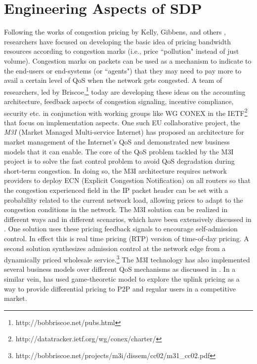 \section{Engineering Aspects of SDP}\label{sec:engg}

Following the works of congestion pricing by Kelly, Gibbens, and others \cite{Kelly-eff,gibbens-kelly,kelly1998rate,kelly2000}, researchers have focused on developing the basic idea of pricing bandwidth resources according to congestion marks (i.e., price ``pollution" instead of just volume). Congestion marks on packets can be used as a mechanism to indicate to the end-users or end-systems (or ``agents") that they may need to pay more to avail a certain level of QoS when the network gets congested. A team of researchers, led by Briscoe,\footnote{http://bobbriscoe.net/pubs.html} today are developing these ideas on the accounting architecture, feedback aspects of congestion signaling, incentive compliance, security etc. in conjunction with working groups like WG CONEX in the IETF\footnote{http://datatracker.ietf.org/wg/conex/charter/} that focus on implementation aspects. One such EU collaborative project, the \emph{M3I} (Market Managed Multi-service Internet) has proposed an architecture for market management of the Internet's QoS and demonstrated new business models that it can enable. The core of the QoS problem tackled by the M3I project is to solve the fast control problem to avoid QoS degradation during short-term congestion. In doing so, the M3I architecture requires network providers to deploy ECN (Explicit Congestion Notification) on all routers so that the congestion experienced field in the IP packet header can be set with a probability related to the current network load, allowing prices to adapt to the congestion conditions in the network. The M3I solution can be realized in different ways and in different scenarios, which have been extensively discussed in \cite{M3I}. One solution uses these pricing feedback signals to encourage self-admission control. In effect this is real time pricing (RTP) version of time-of-day pricing. A second solution synthesizes admission control at the network edge from a dynamically priced wholesale service.\footnote{http://bobbriscoe.net/projects/m3i/dissem/cc02/m31\_cc02.pdf} The M3I technology has also implemented several business models over different QoS mechanisms as discussed in \cite{M3I-business}.  In a similar vein, \cite{Chiu2008} has used game-theoretic model to explore the uplink pricing as a way to provide differential pricing to P2P and regular users in a competitive market.

